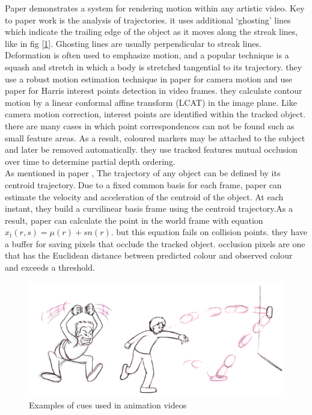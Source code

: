 \documentclass[runningheads]{llncs}
\begin{document}
Paper \cite{collomosse2003video} demonstrates a system for rendering motion within any artistic video. Key to paper \cite{collomosse2003video} work is the analysis of trajectories. it uses additional ‘ghosting’ lines which indicate the trailing edge of the object as it moves along the streak lines, like in fig [\ref{cues}]. Ghosting lines are usually perpendicular to streak lines. Deformation is often used to emphasize motion, and a popular technique is a squash and stretch in which a body is stretched tangential to its trajectory. they use a robust motion estimation technique in paper \cite{torr1995motion} for camera motion and use paper \cite{harris1988stephens} for Harris interest points detection in video frames. they calculate contour motion by a linear conformal affine transform (LCAT) in the image plane. Like camera motion correction, interest points \cite{harris1988stephens} are identified within the tracked object. there are many cases in which point correspondences can not be found such as small feature areas. As a result, coloured markers may be attached to the subject and later be removed automatically. they use tracked features mutual occlusion over time to determine partial depth ordering.\\

As mentioned in paper \cite{harris1988stephens}, The trajectory of any object can be defined by its centroid trajectory. Due to a fixed common basis for each frame, paper can estimate the velocity and acceleration of the centroid of the object. At each instant, they build a curvilinear basis frame using the centroid trajectory.As a result, paper can calculate the point in the world frame with equation $x_t(r,s) = \mu (r) + sn(r)$. but this equation fails on collision points. they have a buffer for saving pixels that occlude the tracked object. occlusion pixels are one that has the Euclidean distance between predicted colour and observed colour and exceeds a threshold.\\

\begin{figure}
\centering
\includegraphics[width=.5\textwidth]{figures/cues.png}
\caption{Examples of cues used in animation videos} \label{cues}
\end{figure}
\end{document}
